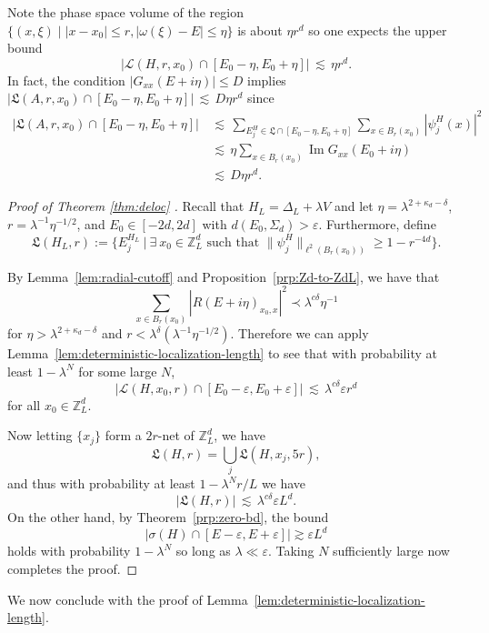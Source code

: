 \documentclass[11pt]{amsart}
\def\bbZ{{\mathbb Z}}
\def\eps{{\varepsilon}}
\newcommand{\Impt}{\operatorname*{Im}}
\def\lsim{{\,\lesssim\,}}
\newcommand{\mcal}[1]{{\mathcal{#1}}}
\newcommand{\ldom}{\prec}
\numberwithin{equation}{section}
\numberwithin{theorem}{section}
\begin{document}
Note the phase space volume of the region $\{(x,\xi) \mid |x-x_0| \leq r, |\omega(\xi)-E|\leq \eta\}$ is about
$\eta r^d$ so one expects the upper bound
\[
|\mcal{L}(H,r,x_0)\cap [E_0-\eta,E_0+\eta]| \lsim \eta r^d.
\]
In fact, the condition $|G_{xx}(E+i\eta)| \leq D$ implies
$|\mathfrak{L}(A,r,x_0)\cap [E_0-\eta,E_0+\eta]| \lsim D \eta r^d$ since
\begin{equation}
\label{eq:basic-B-bound}
\begin{aligned}
|\mathfrak{L}(A,r,x_0)\cap [E_0-\eta,E_0+\eta]|
& \lsim \sum_{E_j^H\in \mathfrak{L}\cap[E_0-\eta,E_0+\eta]}\sum_{x\in B_{r}(x_0)}|\psi_j^H(x)|^2\\
& \lsim \eta \sum_{x\in B_r(x_0)}\Impt G_{xx}(E_0 + i\eta)\\
& \lsim D \eta r^{d}.
\end{aligned}
\end{equation}

\begin{proof}[Proof of Theorem \ref{thm:deloc} ]

Recall that $H_L=\Delta_L + \lambda V$ and let $\eta=\lambda^{2+\kappa_d-\delta}$, $r=\lambda^{-1}\eta^{-1/2}$, and $E_0\in[-2d,2d]$ with $d(E_0,\Sigma_d)>\eps$.  Furthermore, define
$$\mathfrak{L}(H_L,r):= \{E_j^{H_L}\ |\ \exists\  x_0\in \mathbb{Z}^d_L \text{ such that } \|\psi_j^H\|_{\ell^2(B_r(x_0))}\geq 1-r^{-4d}\}.$$

By Lemma~\ref{lem:radial-cutoff} and Proposition~\ref{prp:Zd-to-ZdL}, we have that
\[
\sum_{x\in B_r(x_0)}|R(E+i\eta)_{x_0,x}|^2
\ldom \lambda^{c\delta} \eta^{-1}
\]
for $\eta > \lambda^{2+\kappa_d-\delta}$ and $r <\lambda^\delta (\lambda^{-1}\eta^{-1/2})$.
Therefore we can apply Lemma~\ref{lem:deterministic-localization-length} to see that with  probability at least $1-\lambda^{N}$ for some large $N$,
\[
|\mcal{L}(H,x_0,r)\cap [E_0-\eps,E_0+\eps]| \lsim \lambda^{c\delta} \eps r^d
\]
for all $x_0\in\bbZ^d_L$.

Now letting $\{x_j\}$ form a $2r$-net of $\bbZ^d_L$, we have
\[
\mathfrak{L}(H,r) = \bigcup_j \mathfrak{L}(H,x_j,5r),
\]
and thus with probability at least $1-\lambda^{N}r/L$ we have
\[
|\mathfrak{L}(H,r)| \lsim \lambda^{c\delta}\eps L^d.
\]
On the other hand, by  Theorem~\ref{prp:zero-bd}, the bound
\[
|\sigma(H) \cap [E-\eps,E+\eps]| \gtrsim \eps L^d
\]
holds with probability $1-\lambda^N$ so long as $\lambda\ll \eps$. Taking $N$ sufficiently large now completes the proof.
\end{proof}

We now conclude with the proof of Lemma~\ref{lem:deterministic-localization-length}.
\end{document}
